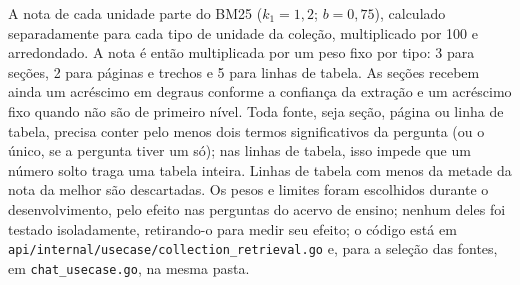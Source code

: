 \documentclass[12pt]{article}
\begin{document}
A nota de cada unidade parte do BM25 ($k_1 = 1{,}2$; $b = 0{,}75$), calculado separadamente para cada tipo de unidade da coleção, multiplicado por 100 e arredondado. A nota é então multiplicada por um peso fixo por tipo: 3 para seções, 2 para páginas e trechos e 5 para linhas de tabela. As seções recebem ainda um acréscimo em degraus conforme a confiança da extração e um acréscimo fixo quando não são de primeiro nível. Toda fonte, seja seção, página ou linha de tabela, precisa conter pelo menos dois termos significativos da pergunta (ou o único, se a pergunta tiver um só); nas linhas de tabela, isso impede que um número solto traga uma tabela inteira. Linhas de tabela com menos da metade da nota da melhor são descartadas. Os pesos e limites foram escolhidos durante o desenvolvimento, pelo efeito nas perguntas do acervo de ensino; nenhum deles foi testado isoladamente, retirando-o para medir seu efeito; o código está em \texttt{api/internal/usecase/collection\_retrieval.go} e, para a seleção das fontes, em \texttt{chat\_usecase.go}, na mesma pasta.
\end{document}
